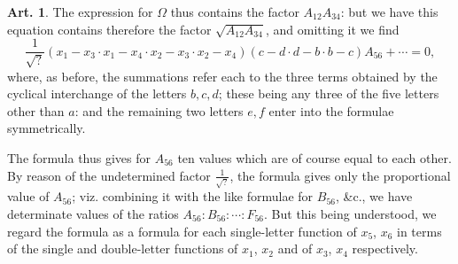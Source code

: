 \documentclass[11pt,a4paper]{article}
\theoremstyle{definition}
\newtheorem{art}{Art.}[section]
\begin{document}
\begin{art}
The expression for $\Omega$ thus contains the factor $A_{12} A_{34}$: but we have this equation contains therefore the factor $\sqrt{A_{12} A_{34}}$, and omitting it we find
\[
\frac{1}{\sqrt{?}} (x_1 - x_3 \cdot x_1 - x_4 \cdot x_2 - x_3 \cdot x_2 - x_4)(c-d \cdot d-b \cdot b-c) A_{56} + \cdots = 0,
\]
where, as before, the summations refer each to the three terms obtained by the cyclical interchange of the letters $b,c,d$; these being any three of the five letters other than $a$: and the remaining two letters $e,f$ enter into the formulae symmetrically.

The formula thus gives for $A_{56}$ ten values which are of course equal to each other. By reason of the undetermined factor $\frac{1}{\sqrt{?}}$, the formula gives only the proportional value of $A_{56}$; viz. combining it with the like formulae for $B_{56}$, \&c., we have determinate values of the ratios $A_{56} : B_{56} : \cdots : F_{56}$. But this being understood, we regard the formula as a formula for each single-letter function of $x_5$, $x_6$ in terms of the single and double-letter functions of $x_1$, $x_2$ and of $x_3$, $x_4$ respectively.
\end{art}
\end{document}
